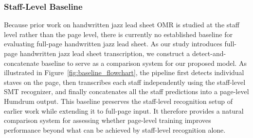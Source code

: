 \documentclass{article}
\begin{document}
\subsubsection{Staff-Level Baseline}
Because prior work on handwritten jazz lead sheet OMR is studied at the staff level rather than the page level, there is currently no established baseline for evaluating full-page handwritten jazz lead sheet.
As our study introduces full-page handwritten jazz lead sheet transcription, we construct a detect-and-concatenate baseline to serve as a comparison system for our proposed model. As illustrated in Figure~\ref{fig:baseline_flowchart}, the pipeline first detects individual staves on the page, then transcribes each staff independently using the staff-level SMT recognizer, and finally concatenates all the staff predictions into a page-level Humdrum output. This baseline preserves the staff-level recognition setup of earlier work while extending it to full-page input. It therefore provides a natural comparison system for assessing whether page-level training improves performance beyond what can be achieved by staff-level recognition alone.
\end{document}
